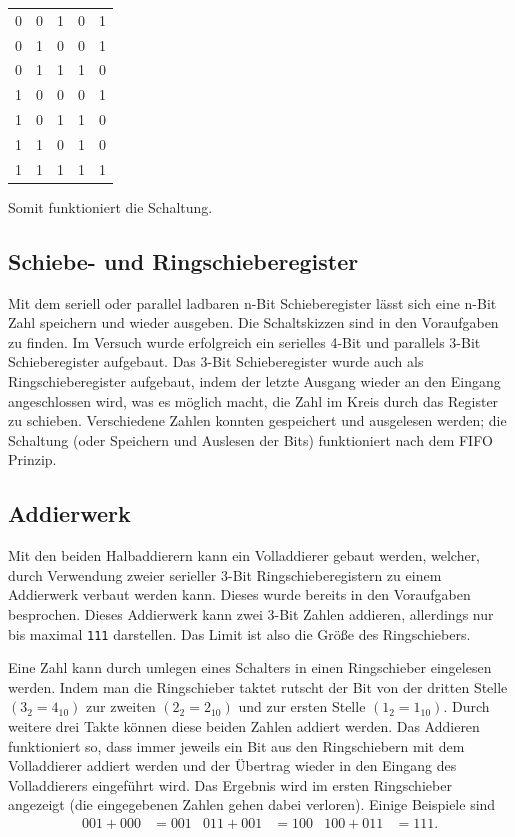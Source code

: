 \documentclass[10pt]{article}
\begin{document}
\begin{multicols}{2}
\begin{center}
\begin{tabular}{|c|c|c|c|c|}
			0        & 0   & 1   & 0   & 1   \\
			0        & 1   & 0   & 0   & 1   \\
			0        & 1   & 1   & 1   & 0   \\
			1        & 0   & 0   & 0   & 1   \\
			1        & 0   & 1   & 1   & 0   \\
			1        & 1   & 0   & 1   & 0   \\
			1        & 1   & 1   & 1   & 1   \\
			\hline
		\end{tabular}
	\end{center}
	Somit funktioniert die Schaltung.

	\subsection{Schiebe- und Ringschieberegister}
	Mit dem seriell oder parallel ladbaren n-Bit Schieberegister lässt sich eine n-Bit Zahl speichern und wieder ausgeben.
	Die Schaltskizzen sind in den Voraufgaben zu finden.
	Im Versuch wurde erfolgreich ein serielles 4-Bit und parallels 3-Bit Schieberegister aufgebaut.
	Das 3-Bit Schieberegister wurde auch als Ringschieberegister aufgebaut, indem der letzte Ausgang wieder an den Eingang angeschlossen wird, was es möglich macht, die Zahl \glqq im Kreis\grqq{} durch das Register zu schieben.
	Verschiedene Zahlen konnten gespeichert und ausgelesen werden; die Schaltung (oder Speichern und Auslesen der Bits) funktioniert nach dem FIFO Prinzip.

	\subsection{Addierwerk}
	Mit den beiden Halbaddierern kann ein Volladdierer gebaut werden, welcher, durch Verwendung zweier serieller 3-Bit Ringschieberegistern zu einem Addierwerk verbaut werden kann.
	Dieses wurde bereits in den Voraufgaben besprochen.
	Dieses Addierwerk kann zwei 3-Bit Zahlen addieren, allerdings nur bis maximal \texttt{111} darstellen.
	Das Limit ist also die Größe des Ringschiebers.
	\par Eine Zahl kann durch umlegen eines Schalters in einen Ringschieber eingelesen werden.
	Indem man die Ringschieber taktet \glqq rutscht\grqq{} der Bit von der dritten Stelle $\left(3_2=4_{10}\right)$ zur zweiten $\left(2_2=2_{10}\right)$ und zur ersten Stelle $\left(1_2=1_{10}\right)$.
	Durch weitere drei Takte können diese beiden Zahlen addiert werden.
	Das Addieren funktioniert so, dass immer jeweils ein Bit aus den Ringschiebern mit dem Volladdierer addiert werden und der Übertrag wieder in den Eingang des Volladdierers eingeführt wird.
	Das Ergebnis wird im ersten Ringschieber angezeigt (die eingegebenen Zahlen gehen dabei verloren).
	Einige Beispiele sind
	\begin{align*}
		001+000 & =001 & 011+001 & =100 & 100+011 & =111
		.
	\end{align*}


\end{multicols}
\end{document}
